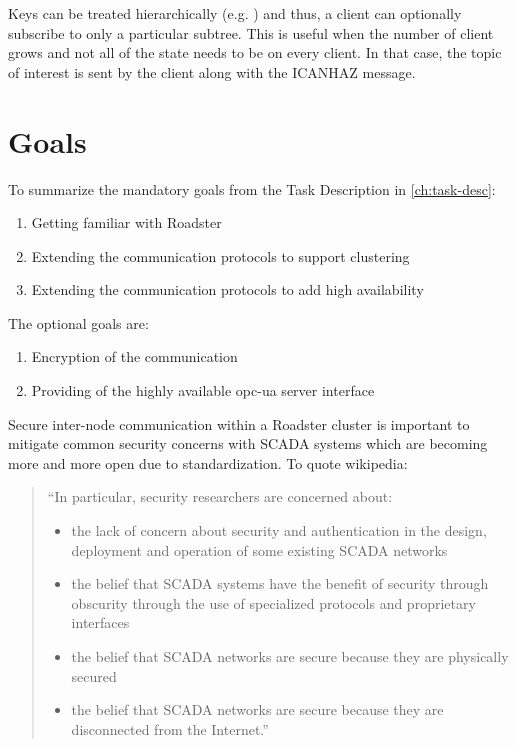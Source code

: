 Keys can be treated hierarchically (e.g. ) and thus, a
client can optionally subscribe to only a particular subtree. This is useful
when the number of client grows and not all of the state needs to be on every
client. In that case, the topic of interest is sent by the client along with
the ICANHAZ message.


\section{Goals}

To summarize the mandatory goals from the Task Description in \autoref{ch:task-desc}:

\begin{enumerate}
	\item Getting familiar with Roadster
	\item Extending the communication protocols to support clustering
	\item Extending the communication protocols to add high availability
\end{enumerate}

The optional goals are:

\begin{enumerate}
	\item Encryption of the communication
	\item Providing of the highly available \gls{opc-ua} server interface
\end{enumerate}

Secure inter-node communication within a Roadster cluster is important to
mitigate common security concerns with SCADA systems which are becoming more
and more open due to standardization. To quote wikipedia:

\begin{quote}
``In particular, security researchers are concerned about:
	\begin{itemize}
		\item the lack of concern about security and authentication in the design, deployment and operation of some existing SCADA networks
		\item the belief that SCADA systems have the benefit of security through obscurity through the use of specialized protocols and proprietary interfaces
		\item the belief that SCADA networks are secure because they are physically secured
		\item the belief that SCADA networks are secure because they are disconnected from the Internet.''
	\end{itemize}
\end{quote}
